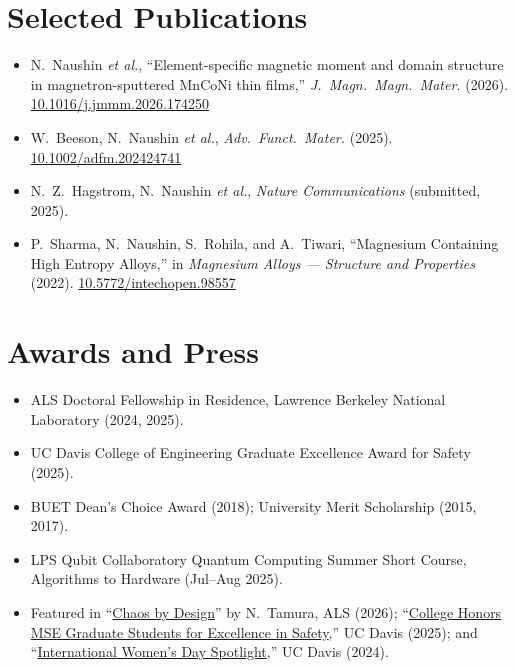 \documentclass[10pt,letterpaper]{article}
\begin{document}
\section{Selected Publications}
\begin{itemize}
  \item N.\ Naushin \textit{et al.}, ``Element-specific magnetic moment and domain structure in
        magnetron-sputtered MnCoNi thin films,'' \textit{J.\ Magn.\ Magn.\ Mater.} (2026).
        \href{https://doi.org/10.1016/j.jmmm.2026.174250}{10.1016/j.jmmm.2026.174250}
  \item W.\ Beeson, N.\ Naushin \textit{et al.}, \textit{Adv.\ Funct.\ Mater.} (2025).
        \href{https://doi.org/10.1002/adfm.202424741}{10.1002/adfm.202424741}
  \item N.\ Z.\ Hagstrom, N.\ Naushin \textit{et al.}, \textit{Nature Communications} (submitted,
        2025).
  \item P.\ Sharma, N.\ Naushin, S.\ Rohila, and A.\ Tiwari, ``Magnesium Containing High Entropy
        Alloys,'' in \textit{Magnesium Alloys --- Structure and Properties} (2022).
        \href{https://doi.org/10.5772/intechopen.98557}{10.5772/intechopen.98557}
\end{itemize}

\section{Awards and Press}
\begin{itemize}
  \item ALS Doctoral Fellowship in Residence, Lawrence Berkeley National Laboratory (2024, 2025).
  \item UC Davis College of Engineering Graduate Excellence Award for Safety (2025).
  \item BUET Dean's Choice Award (2018); University Merit Scholarship (2015, 2017).
  \item LPS Qubit Collaboratory Quantum Computing Summer Short Course, Algorithms to Hardware
        (Jul--Aug 2025).
  \item Featured in
        ``\href{https://nobumichitamura.substack.com/p/chaos-by-design-how-mixing-metals}{Chaos by
        Design}'' by N.\ Tamura, ALS (2026);
        ``\href{https://mse.engineering.ucdavis.edu/news/college-honors-mse-graduate-students-excellence-safety}{College
        Honors MSE Graduate Students for Excellence in Safety},'' UC Davis (2025); and
        ``\href{https://mse.engineering.ucdavis.edu/news/international-womens-day-spotlight-uc-davis-women-materials-science-and-engineering}{International
        Women's Day Spotlight},'' UC Davis (2024).
\end{itemize}
\end{document}
